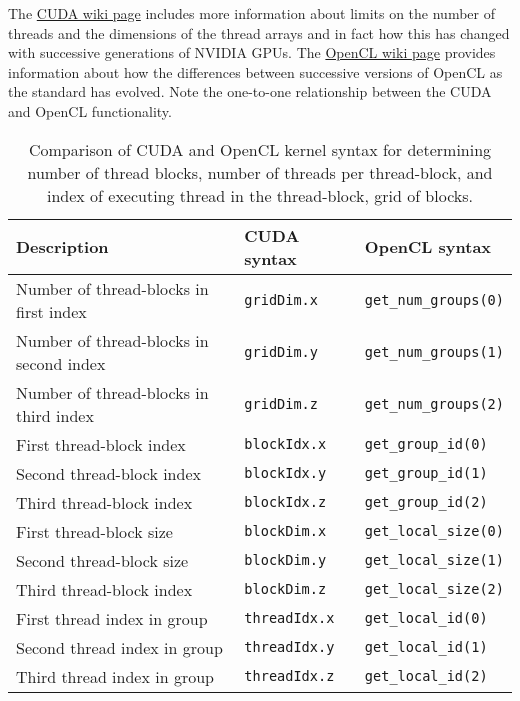 The \href{https://en.wikipedia.org/wiki/CUDA}{CUDA wiki page} includes more information about limits on the number of threads and the dimensions of the thread arrays and in fact how this has changed with successive generations of NVIDIA GPUs.  The \href{https://en.wikipedia.org/wiki/OpenCL}{OpenCL wiki page} provides information about how the differences between successive versions of OpenCL as the standard has evolved. Note the one-to-one relationship between the CUDA and OpenCL functionality.
\begin{table}[htbp!]
    \centering
    \begin{tabular}{l||l|l} \hline
    Description         &  CUDA syntax & OpenCL syntax \\ \hline
    Number of thread-blocks in first index  & \texttt{gridDim.x} & \texttt{get\_num\_groups(0)} \\
   Number of thread-blocks in second index  & \texttt{gridDim.y} & \texttt{get\_num\_groups(1)} \\
    Number of thread-blocks in third index  & \texttt{gridDim.z} & \texttt{get\_num\_groups(2)} \\
    \hline
    First thread-block index  & \texttt{blockIdx.x} & \texttt{get\_group\_id(0)} \\
    Second thread-block index  & \texttt{blockIdx.y} & \texttt{get\_group\_id(1)} \\
    Third thread-block index  & \texttt{blockIdx.z} & \texttt{get\_group\_id(2)} \\ \hline
    First thread-block size  & \texttt{blockDim.x} & \texttt{get\_local\_size(0)} \\
    Second thread-block size  & \texttt{blockDim.y} & \texttt{get\_local\_size(1)} \\
    Third thread-block index  & \texttt{blockDim.z} & \texttt{get\_local\_size(2)} \\ \hline
     First thread index in group & \texttt{threadIdx.x} & \texttt{get\_local\_id(0)} \\
     Second thread index in group & \texttt{threadIdx.y} & \texttt{get\_local\_id(1)} \\
     Third thread index in group & \texttt{threadIdx.z} & \texttt{get\_local\_id(2)} \\ \hline
    \end{tabular}
    \caption{Comparison of CUDA and OpenCL kernel syntax for determining number of thread blocks, number of threads per thread-block, and index of executing thread in the thread-block, grid of blocks.}
    \label{CUDAvOpenCLThreadIndexing.tab}
\end{table}

